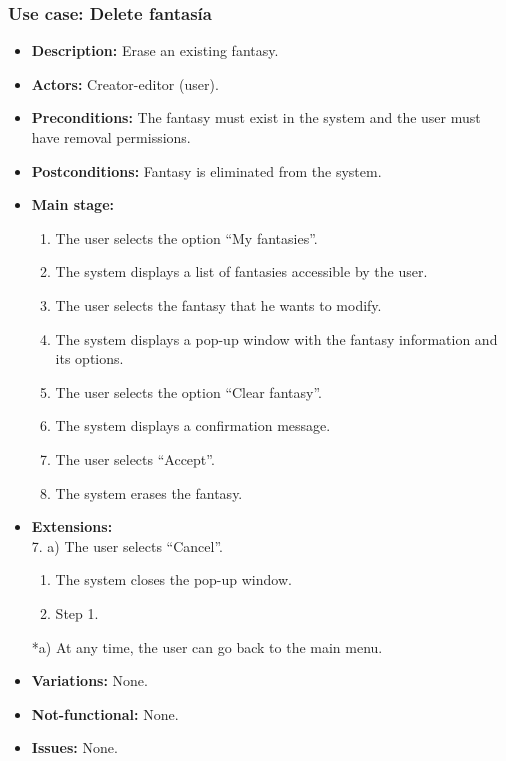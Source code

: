 \subsubsection{Use case: Delete fantasía}
\begin{itemize}
	\item \textbf{Description:} Erase an existing fantasy.
	\item \textbf{Actors:} Creator-editor (user).
	\item \textbf{Preconditions:} The fantasy must exist in the system and the user must have removal permissions.
	\item \textbf{Postconditions:} Fantasy is eliminated from the system.
	\item \textbf{Main stage:}
	\begin{enumerate}
		\item The user selects the option ``My fantasies''.
		\item The system displays a list of fantasies accessible by the user.
		\item The user selects the fantasy that he wants to modify.
		\item The system displays a pop-up window with the fantasy information and its options.
		\item The user selects the option ``Clear fantasy''.
		\item The system displays a confirmation message.
		\item The user selects ``Accept''.
		\item The system erases the fantasy.
	\end{enumerate}
	\item \textbf{Extensions:}  \\7. a) The user selects ``Cancel''.
	\begin{enumerate}
		\item The system closes the pop-up window.
		\item Step 1.
	\end{enumerate}
	*a) At any time, the user can go back to the main menu.
	\item \textbf{Variations:} None.
	\item \textbf{Not-functional:} None.
	\item \textbf{Issues:} None.
\end{itemize}



